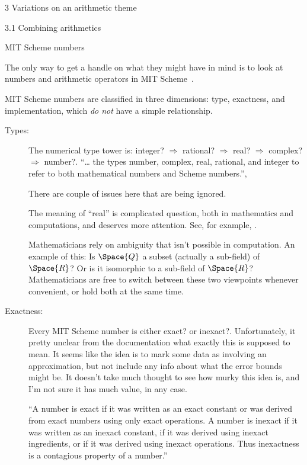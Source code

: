 \documentclass[12pt]{PalisadesLakesBook}
\begin{document}
\begin{plSection}{3 Variations on an arithmetic theme}
\begin{plSection}{3.1 Combining arithmetics}
\begin{plSection}{MIT Scheme numbers}

The only way to get a handle on what they might have in mind
is to look at numbers and arithmetic operators 
in MIT Scheme~\cite[chapter 4]{Hanson:2020:MITSchemeRef}.

MIT Scheme numbers are classified in three dimensions: 
type, exactness, and implementation, which \emph{do not} have
a simple relationship.

\begin{description}
\item[Types:]
The numerical type tower is:
{\schemeFont 
integer? $\Rightarrow$ rational? $\Rightarrow$ real? 
$\Rightarrow$ complex? $\Rightarrow$ number?}.
``{\ldots} the types number, complex,
real, rational, and integer to refer 
to both mathematical numbers and Scheme numbers.'',

There are couple of issues here that are being ignored.

The meaning of ``real'' is complicated question,
both in mathematics and computations,
and deserves more attention.
See, for example, .

Mathematicians rely on ambiguity that isn't possible 
in computation.
An example of this: 
Is $\Space{Q}$ a subset (actually a sub-field) of $\Space{R}$?
Or is it isomorphic to a sub-field of $\Space{R}$?
Mathematicians are free to switch between these two viewpoints
whenever convenient, or hold both at the same time.

\item[Exactness:]
Every MIT Scheme number is either {\schemeFont exact?} or 
{\schemeFont inexact?}.
Unfortunately, it pretty unclear from the documentation
what exactly this is supposed to mean.
It seems like the idea is to mark some data as involving
an approximation, but not include any info about what the
error bounds might be.
It doesn't take much thought to see how murky this idea is,
and I'm not sure it has much value, in any case.

``A number is exact if it was written as an exact constant 
or was derived from exact numbers using only exact operations.
A number is inexact if it was written as an inexact constant, 
if it was derived using inexact ingredients,
or if it was derived using inexact operations. 
Thus inexactness is a contagious property of a 
number.''~\cite[section 4.2]{Hanson:2020:MITSchemeRef}


\end{description}
\end{plSection}
\end{plSection}
\end{plSection}
\end{document}
